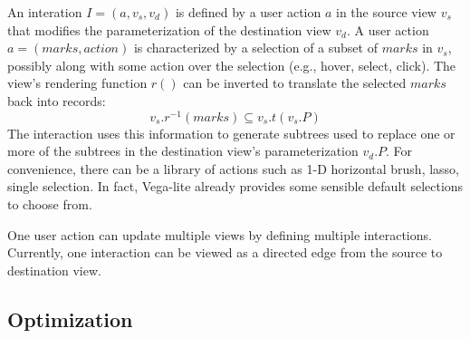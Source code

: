 An interation $I = (a, v_s, v_d)$ is defined by a user action $a$ in the source view $v_s$ that modifies the parameterization of the destination view $v_d$.  A user action $a = (marks, action)$ is characterized by a selection of a subset of $marks$ in $v_s$, possibly along with some action over the selection (e.g., hover, select, click).  The view's rendering function $r()$ can be inverted to translate the selected $marks$ back into records:
%
$$v_s.r^{-1}(marks) \subseteq v_s.t(v_s.P)$$
%
The interaction uses this information to generate subtrees used to replace one or more of the subtrees in the destination view's parameterization $v_d.P$.
For convenience, there can be a library of actions such as 1-D horizontal brush, lasso, single selection.  In fact, Vega-lite already provides some sensible default selections to choose from.  

One user action can update multiple views by defining multiple interactions.  Currently, one interaction can be viewed as a directed edge from the source to destination view.  





\subsection{Optimization}
\fi


